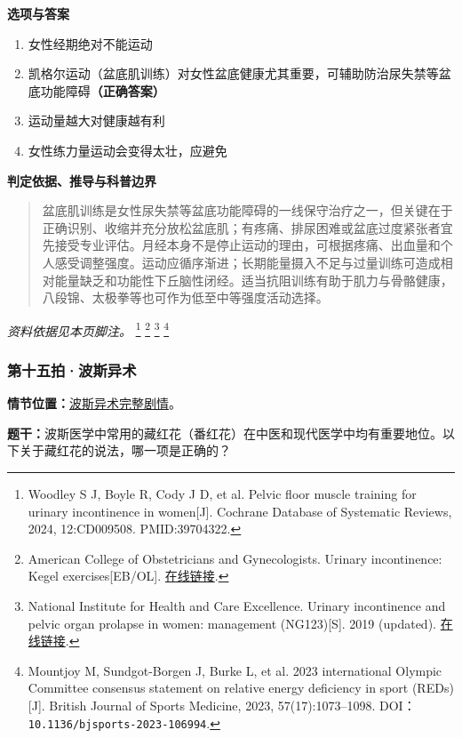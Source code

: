 \textbf{选项与答案}
\begin{enumerate}[label=\Alph*.,leftmargin=*]
  \item 女性经期绝对不能运动
  \item 凯格尔运动（盆底肌训练）对女性盆底健康尤其重要，可辅助防治尿失禁等盆底功能障碍\textbf{（正确答案）}
  \item 运动量越大对健康越有利
  \item 女性练力量运动会变得太壮，应避免
\end{enumerate}
\textbf{判定依据、推导与科普边界}
\begin{quote}盆底肌训练是女性尿失禁等盆底功能障碍的一线保守治疗之一，但关键在于正确识别、收缩并充分放松盆底肌；有疼痛、排尿困难或盆底过度紧张者宜先接受专业评估。月经本身不是停止运动的理由，可根据疼痛、出血量和个人感受调整强度。运动应循序渐进；长期能量摄入不足与过量训练可造成相对能量缺乏和功能性下丘脑性闭经。适当抗阻训练有助于肌力与骨骼健康，八段锦、太极拳等也可作为低至中等强度活动选择。\end{quote}
\noindent\textit{资料依据见本页脚注。}
\footnote{Woodley S J, Boyle R, Cody J D, et al. Pelvic floor muscle training for urinary incontinence in women[J]. Cochrane Database of Systematic Reviews, 2024, 12:CD009508. PMID:39704322.}
\footnote{American College of Obstetricians and Gynecologists. Urinary incontinence: Kegel exercises[EB/OL]. \href{https://www.acog.org/womens-health/faqs/urinary-incontinence}{在线链接}.}
\footnote{National Institute for Health and Care Excellence. Urinary incontinence and pelvic organ prolapse in women: management (NG123)[S]. 2019 (updated). \href{https://www.nice.org.uk/guidance/ng123}{在线链接}.}
\footnote{Mountjoy M, Sundgot-Borgen J, Burke L, et al. 2023 international Olympic Committee consensus statement on relative energy deficiency in sport (REDs)[J]. British Journal of Sports Medicine, 2023, 57(17):1073–1098. DOI：\nolinkurl{10.1136/bjsports-2023-106994}.}

\subsubsection{第十五拍·波斯异术}\label{question:zhaomin:15}
\textbf{情节位置：}\hyperref[plot:zhaomin:15]{波斯异术完整剧情}。

\textbf{题干：}波斯医学中常用的藏红花（番红花）在中医和现代医学中均有重要地位。以下关于藏红花的说法，哪一项是正确的？


